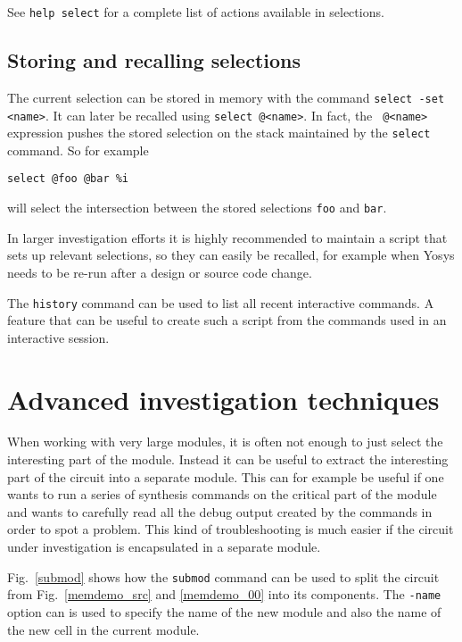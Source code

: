 \documentclass[9pt,technote,a4paper]{IEEEtran}
\begin{document}
See {\tt help select} for a complete list of actions available in selections.

\subsection{Storing and recalling selections}

The current selection can be stored in memory with the command {\tt select -set
<name>}. It can later be recalled using {\tt select @<name>}. In fact, the {\tt
@<name>} expression pushes the stored selection on the stack maintained by the
{\tt select} command. So for example

\begin{verbatim}
select @foo @bar %i
\end{verbatim}

will select the intersection between the stored selections {\tt foo} and {\tt bar}.

\medskip

In larger investigation efforts it is highly recommended to maintain a script that
sets up relevant selections, so they can easily be recalled, for example when
Yosys needs to be re-run after a design or source code change.

The {\tt history} command can be used to list all recent interactive commands.
A feature that can be useful to create such a script from the commands used in
an interactive session.

\section{Advanced investigation techniques}
\label{poke}

When working with very large modules, it is often not enough to just select the
interesting part of the module. Instead it can be useful to extract the
interesting part of the circuit into a separate module. This can for example be
useful if one wants to run a series of synthesis commands on the critical part
of the module and wants to carefully read all the debug output created by the
commands in order to spot a problem. This kind of troubleshooting is much easier
if the circuit under investigation is encapsulated in a separate module.

Fig.~\ref{submod} shows how the {\tt submod} command can be used to split the
circuit from Fig.~\ref{memdemo_src} and \ref{memdemo_00} into its components.
The {\tt -name} option can is used to specify the name of the new module and
also the name of the new cell in the current module.
\end{document}
